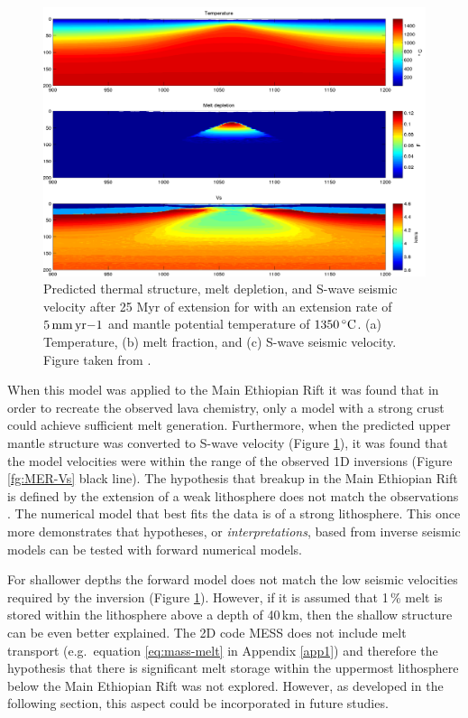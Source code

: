 \begin{figure}
\centering
\includegraphics[width=\textwidth]{./figures/ch2-mantleVs.pdf}
\caption{Predicted thermal structure, melt depletion, and S-wave seismic velocity after 25 Myr of extension for with an extension rate of $5\rm\,mm\,yr{-1}$ and mantle potential temperature of $1350\rm\,^{\circ}C$. (a) Temperature, (b) melt fraction, and (c) S-wave seismic velocity. Figure taken from \cite{armitage-etal-g3-2018}.}
\label{fg:mantleVs}
\end{figure} 

When this model was applied to the Main Ethiopian Rift it was found that in order to recreate the observed lava chemistry, only a model with a strong crust could achieve sufficient melt generation. Furthermore, when the predicted upper mantle structure was converted to S-wave velocity (Figure \ref{fg:mantleVs}), it was found that the model velocities were within the range of the observed 1D inversions (Figure \ref{fg:MER-Vs} black line). The hypothesis that breakup in the Main Ethiopian Rift is defined by the extension of a weak lithosphere does not match the observations \citep[c.f.][]{keranen-etal-2009}. The numerical model that best fits the data is of a strong lithosphere. This once more demonstrates that hypotheses, or \emph{interpretations}, based from inverse seismic models can be tested with forward numerical models.

For shallower depths the forward model does not match the low seismic velocities required by the inversion (Figure \ref{fg:mantleVs}). However, if it is assumed that 1\,\% melt is stored within the lithosphere above a depth of 40\,km, then the shallow structure can be even better explained. The 2D code MESS does not include melt transport (e.g.\ equation \ref{eq:mass-melt} in Appendix \ref{app1}) and therefore the hypothesis that there is significant melt storage within the uppermost lithosphere below the Main Ethiopian Rift was not explored. However, as developed in the following section, this aspect could be incorporated in future studies.


